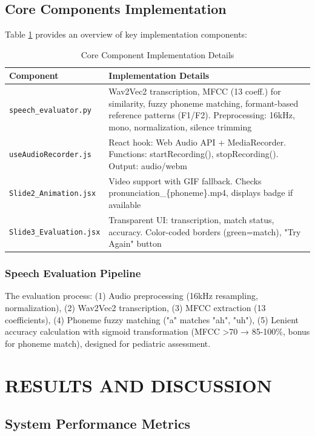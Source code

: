 \documentclass[12pt,a4paper]{article}
\begin{document}
\subsection{Core Components Implementation}

Table \ref{tab:core_components} provides an overview of key implementation components:

\begin{table}[H]
\centering
\caption{Core Component Implementation Details}
\label{tab:core_components}
\small
\begin{tabular}{p{4cm}p{9.5cm}}
\toprule
\textbf{Component} & \textbf{Implementation Details} \\
\midrule
\texttt{speech\_evaluator.py} & Wav2Vec2 transcription, MFCC (13 coeff.) for similarity, fuzzy phoneme matching, formant-based reference patterns (F1/F2). Preprocessing: 16kHz, mono, normalization, silence trimming \\
\hline
\texttt{useAudioRecorder.js} & React hook: Web Audio API + MediaRecorder. Functions: startRecording(), stopRecording(). Output: audio/webm \\
\hline
\texttt{Slide2\_Animation.jsx} & Video support with GIF fallback. Checks pronunciation\_\{phoneme\}.mp4, displays badge if available \\
\hline
\texttt{Slide3\_Evaluation.jsx} & Transparent UI: transcription, match status, accuracy. Color-coded borders (green=match), "Try Again" button \\
\bottomrule
\end{tabular}
\end{table}

\subsubsection{Speech Evaluation Pipeline}

The evaluation process: (1) Audio preprocessing (16kHz resampling, normalization), (2) Wav2Vec2 transcription, (3) MFCC extraction (13 coefficients), (4) Phoneme fuzzy matching ("a" matches "ah", "uh"), (5) Lenient accuracy calculation with sigmoid transformation (MFCC >70 → 85-100\%, bonus for phoneme match), designed for pediatric assessment.

\section{RESULTS AND DISCUSSION}

\subsection{System Performance Metrics}
\end{document}
